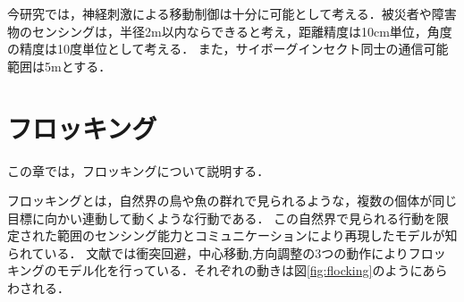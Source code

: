 \documentclass[a4paper,11pt]{jarticle}
\begin{document}
	今研究では，神経刺激による移動制御は十分に可能として考える．被災者や障害物のセンシングは，半径2m以内ならできると考え，距離精度は10cm単位，角度の精度は10度単位として考える．
	また，サイボーグインセクト同士の通信可能範囲は5mとする．
	

	\section{フロッキング}
	\label{sec:flocking}
	この章では，フロッキングについて説明する．
	
	フロッキングとは，自然界の鳥や魚の群れで見られるような，複数の個体が同じ目標に向かい連動して動くような行動である．
	この自然界で見られる行動を限定された範囲のセンシング能力とコミュニケーションにより再現したモデルが知られている．
	文献\cite{steering}では衝突回避，中心移動,方向調整の3つの動作によりフロッキングのモデル化を行っている．それぞれの動きは図\ref{fig:flocking}のようにあらわされる．
	
\end{document}

